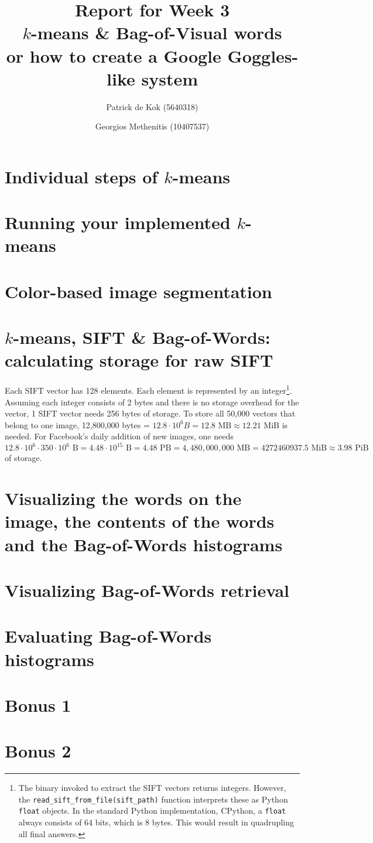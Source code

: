 \documentclass[a4paper,10pt,twoside]{article}
\title{Report for Week 3 \\\normalsize $k$-means \& Bag-of-Visual words\\ or how to create a Google Goggles-like system}
\author{Patrick de Kok (5640318) \and Georgios Methenitis (10407537)}
\begin{document}
\maketitle
\thispagestyle{empty}

\section{Individual steps of $k$-means}

\section{Running your implemented $k$-means}

\section{Color-based image segmentation}

\section{$k$-means, SIFT \& Bag-of-Words: calculating storage for raw SIFT}
Each SIFT vector has 128 elements.  Each element is represented by an integer\footnote{The binary invoked to extract the SIFT vectors returns integers.  However, the \texttt{read\_sift\_from\_file(sift\_path)} function interprets these as Python \texttt{float} objects.  In the standard Python implementation, CPython, a \texttt{float} always consists of 64 bits, which is 8 bytes.  This would result in quadrupling all final answers.}.  Assuming each integer consists of 2 bytes and there is no storage overhead for the vector, 1 SIFT vector needs 256 bytes of storage.  To store all 50,000 vectors that belong to one image, 12,800,000 bytes = $12.8 \cdot 10^6 B = 12.8 \mbox{ MB} \approx 12.21 \mbox{ MiB}$ is needed.  For Facebook's daily addition of new images, one needs $12.8 \cdot 10^6 \cdot 350 \cdot 10^6 \mbox{ B} = 4.48 \cdot 10^{15} \mbox{ B} = 4.48 \mbox{ PB} = 4,480,000,000 \mbox{ MB} = 4272460937.5 \mbox{ MiB} \approx 3.98 \mbox{ PiB}$ of storage.

\section{Visualizing the words on the image, the contents of the words and the Bag-of-Words histograms}

\section{Visualizing Bag-of-Words retrieval}

\section{Evaluating Bag-of-Words histograms}

\section{Bonus 1}

\section{Bonus 2}
\end{document}

